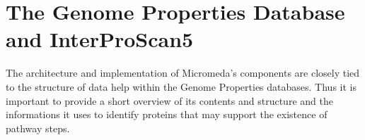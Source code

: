 \chapter{The Genome Properties Database and InterProScan5} \label{genome-properties-chapter} \label{genome-properties}

The architecture and implementation of Micromeda's components are closely tied to the structure of data help within the Genome Properties databases. Thus it is important to provide a short overview of its contents and structure and the informations it uses to identify proteins that may support the existence of pathway steps.